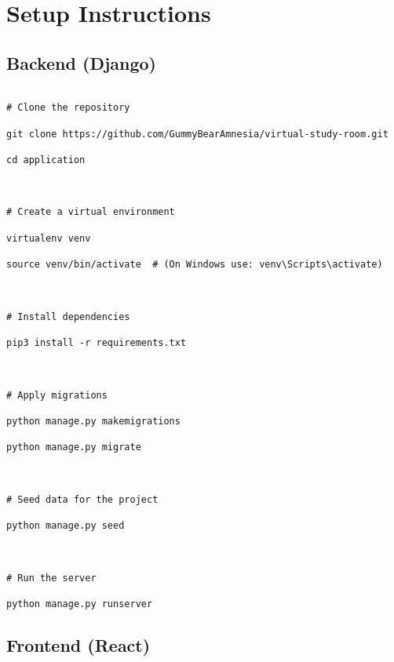 \documentclass[a4paper,12pt]{article}
\begin{document}
\section{Setup Instructions}

\subsection{Backend (Django)}

\begin{verbatim}

# Clone the repository

git clone https://github.com/GummyBearAmnesia/virtual-study-room.git

cd application



# Create a virtual environment

virtualenv venv

source venv/bin/activate  # (On Windows use: venv\Scripts\activate)



# Install dependencies

pip3 install -r requirements.txt



# Apply migrations

python manage.py makemigrations

python manage.py migrate



# Seed data for the project

python manage.py seed



# Run the server

python manage.py runserver

\end{verbatim}



\subsection{Frontend (React)}
\end{document}
